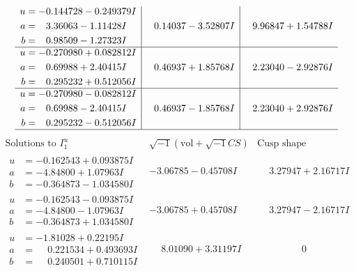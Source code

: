 \documentclass[1p]{elsarticle_modified}
\theoremstyle{definition}
\newcommand{\I}{\sqrt{-1}}
\begin{document}
$$\begin{array}{c|c|c}
\begin{aligned}
u &= -0.144728 - 0.249379 I \\
a &= \phantom{-}3.36063 - 1.11428 I \\
b &= \phantom{-}0.98509 - 1.27323 I\end{aligned}
 & \phantom{-}0.14037 - 3.52807 I & \phantom{-}9.96847 + 1.54788 I \\ \hline\begin{aligned}
u &= -0.270980 + 0.082812 I \\
a &= \phantom{-}0.69988 + 2.40415 I \\
b &= \phantom{-}0.295232 + 0.512056 I\end{aligned}
 & \phantom{-}0.46937 + 1.85768 I & \phantom{-}2.23040 - 2.92876 I \\ \hline\begin{aligned}
u &= -0.270980 - 0.082812 I \\
a &= \phantom{-}0.69988 - 2.40415 I \\
b &= \phantom{-}0.295232 - 0.512056 I\end{aligned}
 & \phantom{-}0.46937 - 1.85768 I & \phantom{-}2.23040 + 2.92876 I\\
 \hline 
 \end{array}$$\newpage$$\begin{array}{c|c|c}  
\text{Solutions to }I^u_{1}& \I (\text{vol} + \sqrt{-1}CS) & \text{Cusp shape}\\
 \hline 
\begin{aligned}
u &= -0.162543 + 0.093875 I \\
a &= -4.84800 + 1.07963 I \\
b &= -0.364873 - 1.034580 I\end{aligned}
 & -3.06785 - 0.45708 I & \phantom{-}3.27947 + 2.16717 I \\ \hline\begin{aligned}
u &= -0.162543 - 0.093875 I \\
a &= -4.84800 - 1.07963 I \\
b &= -0.364873 + 1.034580 I\end{aligned}
 & -3.06785 + 0.45708 I & \phantom{-}3.27947 - 2.16717 I \\ \hline\begin{aligned}
u &= -1.81028 + 0.22195 I \\
a &= \phantom{-}0.221534 + 0.493693 I \\
b &= \phantom{-}0.240501 + 0.710115 I\end{aligned}
 & \phantom{-}8.01090 + 3.31197 I & \phantom{-0.000000 } 0 \\ \hline\begin{aligned}

\end{aligned}
\end{array}$$
\end{document}
